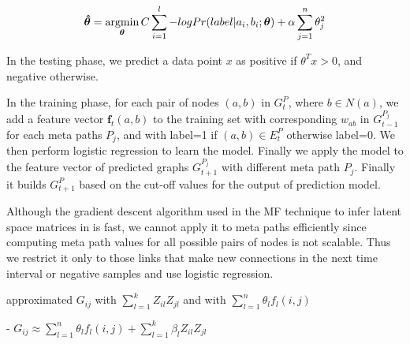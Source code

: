 
\begin{equation}
\boldsymbol{\hat{\theta}} = 
\operatorname*{argmin}\limits_{\boldsymbol{\theta}}C\sum_{i=1}^l -log Pr(label |a_i, b_i; \boldsymbol{\theta}) + \alpha \sum_{j=1}^n \theta_j^2
\end{equation}
 
In the testing phase, we predict a data point $x$ as positive if $\theta^Tx > 0$, and negative otherwise.




In the training phase, for each pair of nodes $(a,b)$ in $G^{P}_{t}$, where $b \in N(a)$, we add a feature vector $\boldsymbol{f}_t(a,b)$ to the training set with corresponding $w_{ab}$ in $G^{P_j}_{t-1}$ for each meta paths $P_j$, and with label=1 if $(a,b) \in E^{P}_{t}$ otherwise label=0. We then perform logistic regression to learn the model. Finally we apply the model to the feature vector of predicted graphs $G^{P_j}_{t+1}$ with different meta path $P_j$. Finally it builds $G^{P}_{t+1}$ based on the cut-off values for the output of prediction model.


Although the gradient descent algorithm used in the MF technique to infer latent space matrices in \cite{Zhu2016} is fast, we cannot apply it to meta paths efficiently since computing meta path values for all possible pairs of nodes is not scalable. Thus we restrict it only to those links that make new connections in the next time interval or negative samples and use logistic regression. 


\cite{Zhu2016} approximated $G_{ij}$ with $\sum_{l=1}^{k} Z_{il}Z_{jl}$ and \cite{sun2011pathsim} with $\sum_{l=1}^{n} \theta_l f_l(i,j)$


- $G_{ij} \approx  \sum_{l=1}^{n} \theta_l f_l(i,j) + \sum_{l=1}^{k} \beta_l Z_{il}Z_{jl}$



